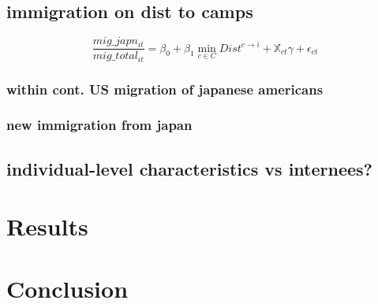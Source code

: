 \documentclass[12pt]{article}
\begin{document}
\subsection{immigration on dist to
camps}\label{immigration-on-dist-to-camps}

\begin{equation}
    \frac{mig\_japn_{it}}{mig\_total_{it}} = \beta_0 + \beta_1 \min_{c\in C} Dist^{c\rightarrow i} 
+ \mathbb{X}_{ct} \gamma +  \epsilon_{ct}
\end{equation}

\subsubsection{within cont. US migration of japanese
americans}\label{within-cont.-us-migration-of-japanese-americans}

\subsubsection{new immigration from
japan}\label{new-immigration-from-japan}

\subsection{individual-level characteristics vs
internees?}\label{individual-level-characteristics-vs-internees}

\section{Results}\label{results}





\section{Conclusion}\label{conclusion}



\end{document}
